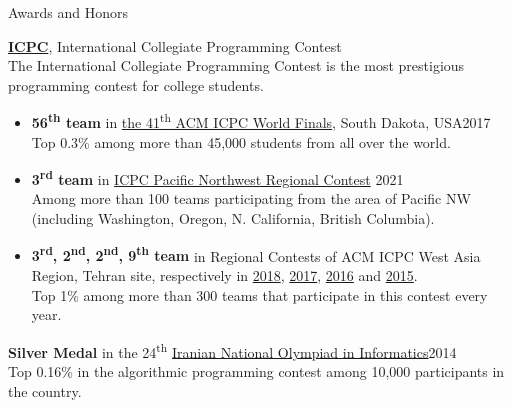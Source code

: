 \documentclass{resume} %
\begin{document}
\begin{rSection}{Awards and Honors}
	
	{\bf \href{http://icpc.baylor.edu/}{ICPC}}, International Collegiate Programming Contest
	\\The International Collegiate Programming Contest is the most prestigious programming contest for college students.
	\smallskip
	\vspace{-0.5em}
	\begin{itemize}[leftmargin=3mm]
		\setlength{\itemsep}{1pt}
		\setlength{\parskip}{1pt}
		\setlength{\parsep}{0pt}
		\renewcommand\labelitemi{$\cdot$}

		\item {\bf 56\textsuperscript{th} team} in
		\href{https://icpc.baylor.edu/community/results-2017}{the 41\textsuperscript{th} ACM ICPC World Finals},
		South Dakota, USA\hfill 2017
		\\ Top 0.3\% among more than 45,000 students from all over the world.
		
		\item {\bf 3\textsuperscript{rd} team} in \href{http://www.acmicpc-pacnw.org/scoreboard/2020/index1.html}{ICPC Pacific Northwest Regional Contest}
		\hfill 2021
		\\ Among more than 100 teams participating from the area of Pacific NW (including Washington, Oregon, N. California, British Columbia).

		\item {\bf 3\textsuperscript{rd}, 2\textsuperscript{nd}, 2\textsuperscript{nd}, 9\textsuperscript{th} team} in Regional Contests of ACM ICPC West Asia Region,
		Tehran site, respectively in
		\href{http://icpc.sharif.edu/acmicpc18/scoreboard/}{2018},
		\href{http://icpc.sharif.edu/acmicpc17/scoreboard/}{2017},
		\href{http://icpc.sharif.edu/acmicpc16/scoreboard/}{2016} and
		\href{http://icpc.sharif.edu/acmicpc15/scoreboard/}{2015}.
		\\ Top 1\% among more than 300 teams that participate in this contest every year.
	\end{itemize}
	
	{\bf Silver Medal} in the 24\textsuperscript{th} \href{http://inoi.ir/}{Iranian National Olympiad in Informatics}\hfill 2014
	\smallskip
	\\Top 0.16\% in the algorithmic programming contest among 10,000 participants in the country.

\end{rSection}
\end{document}
